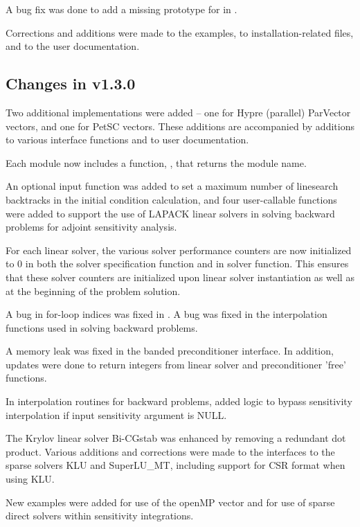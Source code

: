 A bug fix was done to add a missing prototype for  
in .
 
Corrections and additions were made to the examples, 
to installation-related files,
and to the user documentation.

\subsection*{Changes in v1.3.0}

Two additional {\nvector} implementations were added -- one for
Hypre (parallel) ParVector vectors, and one for PetSC vectors.  These
additions are accompanied by additions to various interface functions
and to user documentation.

Each {\nvector} module now includes a function, ,
that returns the {\nvector} module name.

An optional input function was added to set a maximum number
of linesearch backtracks in the initial condition calculation, and
four user-callable functions were added to support the use of LAPACK
linear solvers in solving backward problems for adjoint sensitivity
analysis.

For each linear solver, the various solver performance counters are
now initialized to 0 in both the solver specification function and in
solver  function.  This ensures that these solver counters
are initialized upon linear solver instantiation as well as at the
beginning of the problem solution.

A bug in for-loop indices was fixed in . A bug was
fixed in the interpolation functions used in solving backward problems.

A memory leak was fixed in the banded preconditioner interface.
In addition, updates were done to return integers from linear solver 
and preconditioner 'free' functions.

In interpolation routines for backward problems, added logic to bypass 
sensitivity interpolation if input sensitivity argument is NULL.

The Krylov linear solver Bi-CGstab was enhanced by removing a redundant
dot product.  Various additions and corrections were made to the
interfaces to the sparse solvers KLU and SuperLU\_MT, including support
for CSR format when using KLU.

New examples were added for use of the openMP vector and for use of 
sparse direct solvers within sensitivity integrations.

